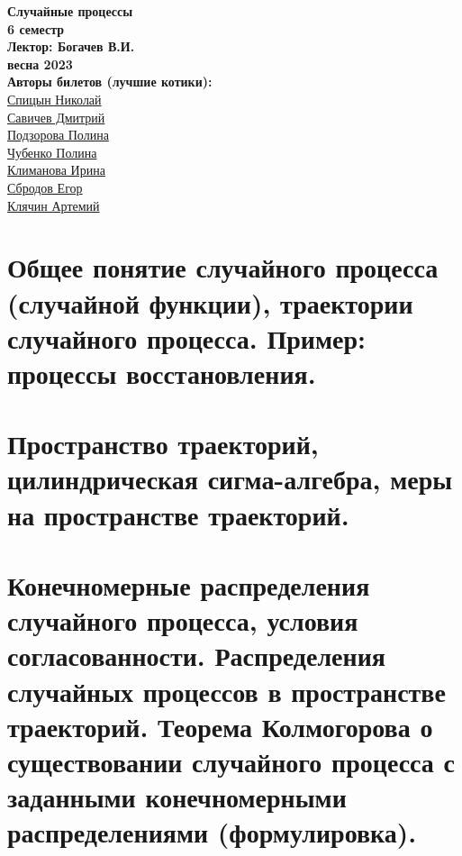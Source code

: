 


    \thispagestyle{empty}
    \BgThispage
    \begin{center}
        \vspace*{4cm}
        
        \Huge
        \textbf{Случайные процессы} \\
        \textbf{6 семестр} \\
        \textbf{Лектор: Богачев В.И.} \\
        \textbf{весна 2023} \\
        
        \vspace{7cm}
        \Large
        \textbf{Авторы билетов (лучшие котики):} \\
        \href{https://vk.com/spitsynn}{Спицын Николай} \\
        \href{https://vk.com/dimasav123}{Савичев Дмитрий} \\
        \href{https://vk.com/id165779384}{Подзорова Полина} \\
        \href{https://vk.com/poli.dobro}{Чубенко Полина} \\        
        \href{https://vk.com/meraklim}{Климанова Ирина} \\
        \href{https://vk.com/ulegor}{Сбродов Егор} \\    
        \href{https://vk.com/artemiy.kliachin}{Клячин Артемий} \\ 
    \end{center}
\newpage

\tableofcontents
\newpage


\section{Общее понятие случайного процесса (случайной функции), траектории случайного процесса. Пример: процессы восстановления.}

\section{Пространство траекторий, цилиндрическая сигма-алгебра, меры на пространстве траекторий.}

\section{Конечномерные распределения случайного процесса, условия согласованности. Распределения случайных процессов в пространстве траекторий. Теорема Колмогорова о существовании случайного процесса с заданными конечномерными распределениями (формулировка).}

